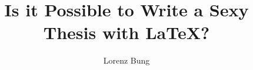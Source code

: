 \documentclass[]{htwg-report}
\begin{document}
\frontmatter



\title[Is it Possible to Write a Sexy Thesis with LaTeX?]{Is it Possible to Write a Sexy Thesis with LaTeX?}

\author{Lorenz Bung}
\newcommand{\verfasser}{Lorenz Bung}
\newcommand{\thema}{Is it Possible to Write a Sexy Thesis with LaTeX?}
\newcommand{\dob}{26.06.1997}
\newcommand{\birthplace}{Konstanz}
\newcommand{\hochschule}{Hochschule für Technik, Wirtschaft und Gestaltung}
\newcommand{\institut}{Isys Vision GmbH}
\newcommand{\prueferA}{Prof. Dr. Georg Umlauf}
\newcommand{\prueferB}{Simon Schmei{\ss}er}
\newcommand{\ausgabedatum}{01.04.2020}
\newcommand{\abgabedatum}{30.06.2020}
\newcommand{\type}{Bachelor}
\newcommand{\typeshortcut}{B}
\newcommand{\studiengang}{Angewandte Informatik}
\newcommand{\strasse}{Banater Str. 9}
\newcommand{\wohnort}{78467 Konstanz}
\newcommand{\schlagworte}{Robotics, Geometric Modeling, Machine Vision, Mesh Reconstruction}


\makecover[]
%          






\tableofcontents

\mainmatter



\appendix

%

\printbibliography[heading=bibintoc]
\end{document}
